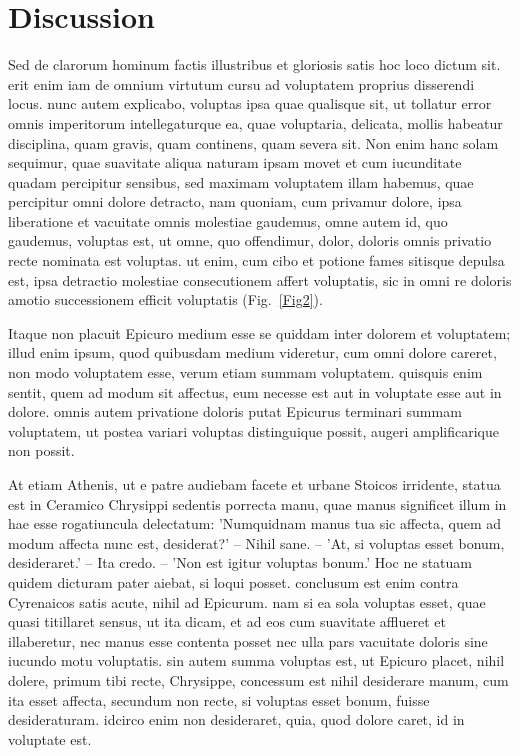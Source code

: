\documentclass[a4paper,12pt]{article}
\begin{document}
\section*{Discussion}

Sed de clarorum hominum factis illustribus et gloriosis satis hoc loco dictum sit. erit
enim iam de omnium virtutum cursu ad voluptatem proprius disserendi locus. nunc autem
explicabo, voluptas ipsa quae qualisque sit, ut tollatur error omnis imperitorum
intellegaturque ea, quae voluptaria, delicata, mollis habeatur disciplina, quam gravis,
quam continens, quam severa sit. Non enim hanc solam sequimur, quae suavitate aliqua
naturam ipsam movet et cum iucunditate quadam percipitur sensibus, sed maximam voluptatem
illam habemus, quae percipitur omni dolore detracto, nam quoniam, cum privamur dolore,
ipsa liberatione et vacuitate omnis molestiae gaudemus, omne autem id, quo gaudemus,
voluptas est, ut omne, quo offendimur, dolor, doloris omnis privatio recte nominata est
voluptas. ut enim, cum cibo et potione fames sitisque depulsa est, ipsa detractio
molestiae consecutionem affert voluptatis, sic in omni re doloris amotio successionem
efficit voluptatis (Fig.~\ref{Fig2}). 

Itaque non placuit Epicuro medium esse se quiddam inter dolorem et voluptatem; illud enim
ipsum, quod quibusdam medium videretur, cum omni dolore careret, non modo voluptatem esse,
verum etiam summam voluptatem. quisquis enim sentit, quem ad modum sit affectus, eum
necesse est aut in voluptate esse aut in dolore. omnis autem privatione doloris putat
Epicurus terminari summam voluptatem, ut postea variari voluptas distinguique possit,
augeri amplificarique non possit.

At etiam Athenis, ut e patre audiebam facete et urbane Stoicos irridente, statua est in
Ceramico Chrysippi sedentis porrecta manu, quae manus significet illum in hae esse
rogatiuncula delectatum: 'Numquidnam manus tua sic affecta, quem ad modum affecta nunc
est, desiderat?' -- Nihil sane. -- 'At, si voluptas esset bonum, desideraret.' -- Ita
credo. -- 'Non est igitur voluptas bonum.' Hoc ne statuam quidem dicturam pater aiebat, si
loqui posset. conclusum est enim contra Cyrenaicos satis acute, nihil ad Epicurum. nam si
ea sola voluptas esset, quae quasi titillaret sensus, ut ita dicam, et ad eos cum
suavitate afflueret et illaberetur, nec manus esse contenta posset nec ulla pars vacuitate
doloris sine iucundo motu voluptatis. sin autem summa voluptas est, ut Epicuro placet,
nihil dolere, primum tibi recte, Chrysippe, concessum est nihil desiderare manum, cum ita
esset affecta, secundum non recte, si voluptas esset bonum, fuisse desideraturam. idcirco
enim non desideraret, quia, quod dolore caret, id in voluptate est.
\end{document}
